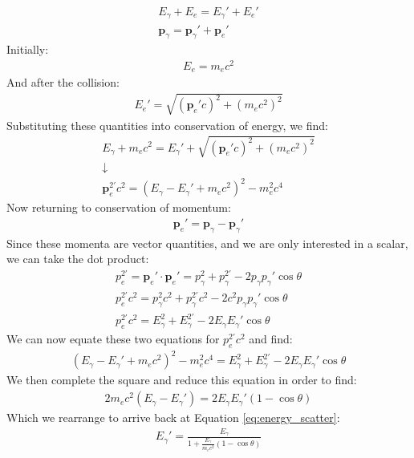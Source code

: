 \documentclass[%
 reprint,
 amsmath,amssymb,
 aps,
 pra,
]{revtex4-1}
\begin{document}
\begin{appendix}
\begin{gather}
	E_\gamma + E_e = E_\gamma ' + E_e '\nonumber \\
	\mathbf{p}_\gamma = \mathbf{p}_\gamma' + \mathbf{p}_e' \nonumber
\end{gather}
Initially:
\begin{gather}
	E_e = m_e c^2 \nonumber
\end{gather}
And after the collision:
\begin{gather}
	E_e' = \sqrt{(\mathbf{p}_e' c)^2 + (m_e c^2)^2} \nonumber
\end{gather}
Substituting these quantities into conservation of energy, we find:
\begin{gather}
	E_\gamma + m_e c^2 = E_\gamma' + \sqrt{(\mathbf{p}_e' c)^2 + (m_e c^2)^2} \nonumber \\
	\downarrow \nonumber \\
	\mathbf{p}_e^{2'} c^2  = (E_\gamma - E_\gamma' + m_e c^2)^2 - m_e^2 c^4 \nonumber
\end{gather}
Now returning to conservation of momentum:
\begin{gather}
	\mathbf{p}_e' = \mathbf{p}_\gamma - \mathbf{p}_\gamma' \nonumber
\end{gather}
Since these momenta are vector quantities, and we are only interested in a scalar, we can take the dot product:
\begin{gather}
	p_e^{2'} = \mathbf{p}_e' \cdot \mathbf{p}_e' = p_\gamma^2 + p_\gamma^{2'} - 2 p_\gamma p_\gamma' \cos{\theta} \nonumber \\
	p_e^{2'} c^2 =  p_\gamma^2 c^2 + p_\gamma^{2'} c^2 - 2 c^2 p_\gamma p_\gamma' \cos{\theta} \nonumber \\
	p_e^{2'} c^2 = E_\gamma^2 + E_\gamma^{2'} - 2 E_\gamma E_\gamma' \cos{\theta} \nonumber
\end{gather}
We can now equate these two equations for $p_e^{2'} c^2$ and find:
\begin{gather}
	(E_\gamma - E_\gamma' + m_e c^2)^2 - m_e^2 c^4 = E_\gamma^2 + E_\gamma^{2'} - 2 E_\gamma E_\gamma' \cos{\theta} \nonumber
\end{gather}
We then complete the square and reduce this equation in order to find:
\begin{gather}
	2 m_e c^2 (E_\gamma - E_\gamma') = 2 E_\gamma E_\gamma' (1- \cos{\theta}) \nonumber
\end{gather}
Which we rearrange to arrive back at Equation \ref{eq:energy_scatter}:
\begin{gather}
	E_\gamma ' = \frac{E_\gamma}{1 + \frac{E_\gamma}{m_e c^2} (1 - \cos{\theta})} \nonumber
\end{gather}

\end{appendix}
\end{document}
